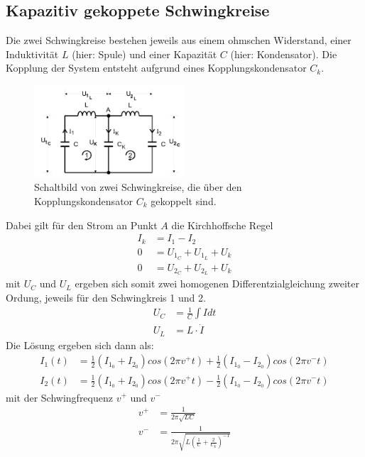 \subsection{Kapazitiv gekoppete Schwingkreise}
Die zwei Schwingkreise bestehen jeweils aus einem ohmschen Widerstand, einer Induktivität $L$
(hier: Spule) und einer Kapazität $C$ (hier: Kondensator). Die Kopplung der System 
entsteht aufgrund eines Kopplungskondensator $C_k$.\\
\begin{figure}[H]
    \centering
    \includegraphics[width=0.5\textwidth]{bilder/schwingkreis_allgemein.jpg}
    \caption{Schaltbild von zwei Schwingkreise, die über den Kopplungskondensator $C_k$ gekoppelt sind. \cite[299]{Anleitung}}
\end{figure} 
Dabei gilt für den Strom an Punkt $A$ die Kirchhoffsche Regel
\begin{align}
    I_k&=I_1-I_2 \\
    0&=U_{1_C}+U_{1_L}+U_k\\
    0&=U_{2_C}+U_{2_L}+U_k
\end{align}
mit $U_C$ und $U_L$ ergeben sich somit zwei homogenen Differentzialgleichung zweiter Ordung, 
jeweils für den Schwingkreis 1 und 2. 
\begin{align}
    U_C&=\frac{1}{C}\int{I dt}\\
    U_L&=L \cdot \dot{I}
\end{align}
Die Lösung ergeben sich dann als:
\begin{align}
    I_1(t)&=\frac{1}{2} \left( I_{1_0}+I_{2_0}\right)cos\left(2 \pi v^+ t\right)+\frac{1}{2}\left(I_{1_0}-I_{2_0}\right)cos\left(2 \pi v^- t\right)\\
    I_2(t)&=\frac{1}{2}\left(I_{1_0}+I_{2_0}\right)cos\left(2 \pi v^+ t\right)-\frac{1}{2}\left(I_{1_0}-I_{2_0}\right)cos\left(2 \pi v^- t\right)
\end{align}
mit der Schwingfrequenz $v^+$ und $v^-$ 
\begin{align}
    v^+&=\frac{1}{2\pi\sqrt{LC}}
    \label{eqn:Fundamental_Frequenzen1}\\
    v^-&=\frac{1}{2 \pi \sqrt{L\left(\frac{1}{C}+\frac{2}{C_k}\right)^{-1}}}
    \label{eqn:Fundamental_Frequenzen2}
\end{align}
